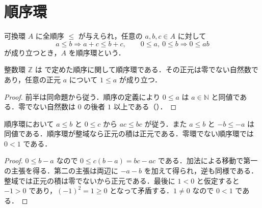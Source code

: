 \section{順序環}
\begin{defn}[順序環]
可換環 $A$ に全順序 $\leq$ が与えられ，任意の $a,b,c\in A$ に対して
\[
 a\leq b\Longrightarrow a+c\leq b+c,\qquad
 0\leq a,\ 0\leq b\Longrightarrow 0\leq ab
\]
が成り立つとき，$A$ を順序環という．
\end{defn}
\begin{prop}[整数の順序環としての性質]
整数環 $\mathbb Z$ は で定めた順序に関して順序環である．その正元は零でない自然数であり，任意の正元 $a$ について $1\leq a$ が成り立つ．
\end{prop}
\begin{proof}
前半は同命題から従う．順序の定義により $0\leq a$ は $a\in\mathbb N$ と同値である．零でない自然数は $0$ の後者 $1$ 以上である（）．
\end{proof}
\begin{prop}[順序環の不等式と符号]
順序環において $a\leq b$ と $0\leq c$ から $ac\leq bc$ が従う．また $a\leq b$ と $-b\leq-a$ は同値である．順序環が整域なら正元の積は正元である．零環でない順序環では $0<1$ である．
\end{prop}
\begin{proof}
$0\leq b-a$ なので $0\leq c(b-a)=bc-ac$ である．加法による移動で第一の主張を得る．第二の主張は両辺に $-a-b$ を加えて得られ，逆も同様である．整域では正元の積は零でないから正元である．最後に $1<0$ と仮定すると $-1>0$ であり，$(-1)^2=1\geq0$ となって矛盾する．$1\ne0$ なので $0<1$ である．
\end{proof}
